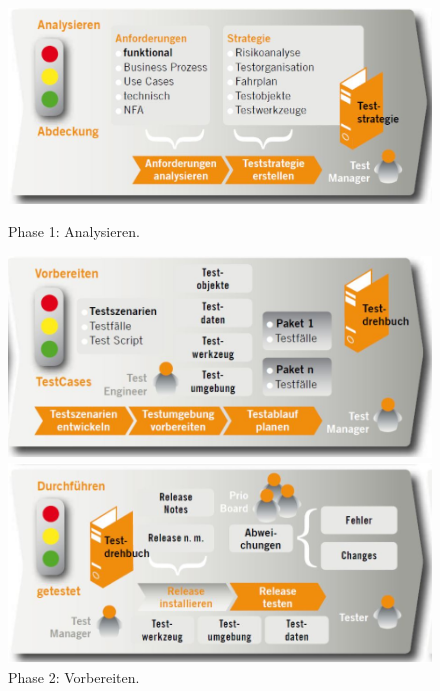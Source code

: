 \begin{figure}
    \centering
    \begin{minipage}{.48\textwidth}
        \centering
        \includegraphics[width=1\linewidth]{02/bilder/Testprozess1.JPG}
        \caption{Phase 1: Analysieren.} 
        \vspace{2ex}
    \end{minipage}
    \begin{minipage}{.48\textwidth}
        \centering
        \includegraphics[width=1\linewidth]{02/bilder/Testprozess2.JPG}
        \caption{Phase 2: Vorbereiten.} 
        \vspace{2ex}
    \end{minipage}
    \begin{minipage}{.48\textwidth}
        \centering
        \includegraphics[width=1\linewidth]{02/bilder/Testprozess3.JPG}

\end{minipage}
\end{figure}

